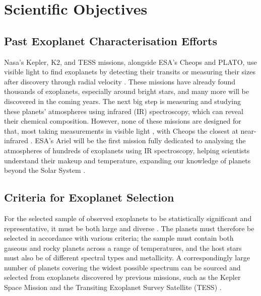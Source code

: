 \documentclass[12pt]{article}
\begin{document}
\newpage

\section{Scientific Objectives} \label{sec:3}

\subsection{Past Exoplanet Characterisation Efforts} \label{sec:3.1}

Nasa's Kepler, K2, and TESS missions, alongside ESA's Cheops and PLATO, use visible light to find exoplanets by detecting their transits or measuring their sizes after discovery through radial velocity \cite{ARIEL_M4_Proposal}.
These missions have already found thousands of exoplanets, especially around bright stars, and many more will be discovered in the coming years. The next big step is measuring and studying these planets' atmospheres using infrared (IR) spectroscopy, which can reveal their chemical composition.
However, none of these missions are designed for that, most taking measurements in visible light \cite{platofact,keplerfact} \cite[p.8]{tessfact}, with Cheops the closest at near-infrared \cite[p.4]{fortier2024cheops}.
ESA's Ariel will be the first mission fully dedicated to analysing the atmospheres of hundreds of exoplanets using IR spectroscopy, helping scientists understand their makeup and temperature, expanding our knowledge of planets beyond the Solar System \cite{salvignol2024ariel,ARIEL_M4_Proposal}.

\subsection{Criteria for Exoplanet Selection} \label{sec:3.2}

For the selected sample of observed exoplanets to be statistically significant and representative, it must be both large and diverse \cite{zingales2018ariel}.
The planets must therefore be selected in accordance with various criteria; the sample must contain both gaseous and rocky planets across a range of temperatures, and the host stars must also be of
different spectral types and metallicity. A correspondingly large number of planets covering the widest possible spectrum can be sourced and selected from exoplanets discovered by previous missions, such as
the Kepler Space Mission \cite{zingales2018ariel} and the Transiting Exoplanet Survey Satellite (TESS) \cite{arielTESScandidates}.
\end{document}
